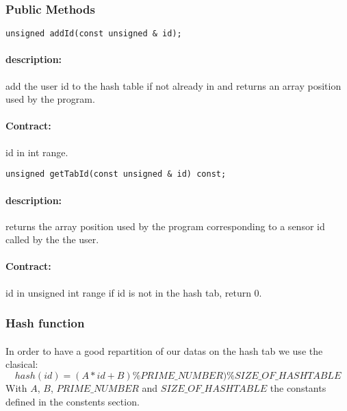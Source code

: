 \documentclass[a4paper, 12pts]{article}
\begin{document}
    
\subsubsection{Public Methods}

\begin{lstlisting}
unsigned addId(const unsigned & id);
\end{lstlisting}
\paragraph{description:}
	add the user id to the hash table if not already in and returns an array position used by the program.
\paragraph{Contract:}
	id in int range.
\begin{lstlisting}
unsigned getTabId(const unsigned & id) const;
\end{lstlisting}
\paragraph{description:}
	returns the array position used by the program corresponding to a sensor id called by the the user.
\paragraph{Contract:}
	id in unsigned int range if id is not in the hash tab, return 0.
	
\subsubsection{Hash function}

\paragraph{}
	In order to have a good repartition of our datas on the hash tab we use the clasical:
\begin{equation}
	hash(id)=(A*id+B)\%PRIME\_NUMBER)\%SIZE\_OF\_HASHTABLE
\end{equation}	
	With $A$, $B$, $PRIME\_NUMBER$ and $SIZE\_OF\_HASHTABLE$ the constants defined in the constents section.
	
\end{document}
